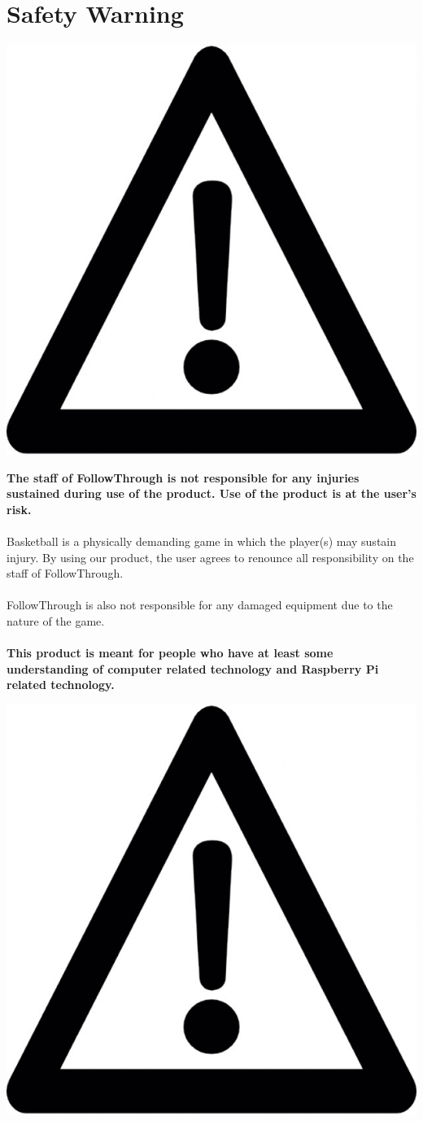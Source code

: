 \chapter{Safety Warning}

\hspace{0pt}
\vfill
\begin{center}
    \includegraphics[width = 0.2 \textwidth]{Pieces/warning.jpg}
\end{center}
\textbf{The staff of FollowThrough is not responsible for any injuries sustained during use of the product. Use of the product is at the user's risk.}\\
\\Basketball is a physically demanding game in which the player(s) may sustain injury. By using our product, the user agrees to renounce all responsibility on the staff of FollowThrough.\\ \\FollowThrough is also not responsible for any damaged equipment due to the nature of the game.\\ \\\textbf{This product is meant for people who have at least some understanding of computer related technology and Raspberry Pi related technology.}
\begin{center}
    \includegraphics[width = 0.2 \textwidth]{Pieces/warning.jpg}
\end{center}
\vfill
\hspace{0pt}
\pagebreak
